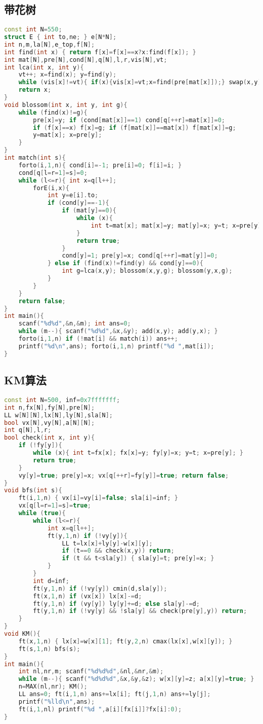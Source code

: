 \documentclass[landscape,a4paper]{article}
\begin{document}
\subsection{带花树}
\begin{lstlisting}[language=C++]
const int N=550;
struct E { int to,ne; } e[N*N];
int n,m,la[N],e_top,f[N];
int find(int x) { return f[x]=f[x]==x?x:find(f[x]); }
int mat[N],pre[N],cond[N],q[N],l,r,vis[N],vt;
int lca(int x, int y){
	vt++; x=find(x); y=find(y);
	while (vis[x]!=vt){ if(x){vis[x]=vt;x=find(pre[mat[x]]);} swap(x,y); }
	return x;
}
void blossom(int x, int y, int g){
	while (find(x)!=g){
		pre[x]=y; if (cond[mat[x]]==1) cond[q[++r]=mat[x]]=0;
		if (f[x]==x) f[x]=g; if (f[mat[x]]==mat[x]) f[mat[x]]=g;
		y=mat[x]; x=pre[y];
	}
}
int match(int s){
	forto(i,1,n){ cond[i]=-1; pre[i]=0; f[i]=i; }
	cond[q[l=r=1]=s]=0;
	while (l<=r){ int x=q[l++];
		forE(i,x){
			int y=e[i].to;
			if (cond[y]==-1){
				if (mat[y]==0){
					while (x){
						int t=mat[x]; mat[x]=y; mat[y]=x; y=t; x=pre[y];
					}
					return true;
				}
				cond[y]=1; pre[y]=x; cond[q[++r]=mat[y]]=0;
			} else if (find(x)!=find(y) && cond[y]==0){
				int g=lca(x,y); blossom(x,y,g); blossom(y,x,g);
			}
		}
	}
	return false;
}
int main(){
	scanf("%d%d",&n,&m); int ans=0;
	while (m--){ scanf("%d%d",&x,&y); add(x,y); add(y,x); }
	forto(i,1,n) if (!mat[i] && match(i)) ans++;
	printf("%d\n",ans); forto(i,1,n) printf("%d ",mat[i]);
}
\end{lstlisting}

\subsection{KM算法}
\begin{lstlisting}[language=C++]
const int N=500, inf=0x7fffffff;
int n,fx[N],fy[N],pre[N];
LL w[N][N],lx[N],ly[N],sla[N];
bool vx[N],vy[N],a[N][N];
int q[N],l,r;
bool check(int x, int y){
	if (!fy[y]){
		while (x){ int t=fx[x]; fx[x]=y; fy[y]=x; y=t; x=pre[y]; }
		return true;
	}
	vy[y]=true; pre[y]=x; vx[q[++r]=fy[y]]=true; return false;
}
void bfs(int s){
	ft(i,1,n) { vx[i]=vy[i]=false; sla[i]=inf; }
	vx[q[l=r=1]=s]=true;
	while (true){
		while (l<=r){
			int x=q[l++];
			ft(y,1,n) if (!vy[y]){
				LL t=lx[x]+ly[y]-w[x][y];
				if (t==0 && check(x,y)) return;
				if (t && t<sla[y]) { sla[y]=t; pre[y]=x; }
			}
		}
		int d=inf;
		ft(y,1,n) if (!vy[y]) cmin(d,sla[y]);
		ft(x,1,n) if (vx[x]) lx[x]-=d;
		ft(y,1,n) if (vy[y]) ly[y]+=d; else sla[y]-=d;
		ft(y,1,n) if (!vy[y] && !sla[y] && check(pre[y],y)) return;
	}
}
void KM(){
	ft(x,1,n) { lx[x]=w[x][1]; ft(y,2,n) cmax(lx[x],w[x][y]); }
	ft(s,1,n) bfs(s);
}
int main(){
	int nl,nr,m; scanf("%d%d%d",&nl,&nr,&m);
	while (m--){ scanf("%d%d%d",&x,&y,&z); w[x][y]=z; a[x][y]=true; }
	n=MAX(nl,nr); KM();
	LL ans=0; ft(i,1,n) ans+=lx[i]; ft(j,1,n) ans+=ly[j];
	printf("%lld\n",ans);
	ft(i,1,nl) printf("%d ",a[i][fx[i]]?fx[i]:0);
}
\end{lstlisting}
\end{document}
